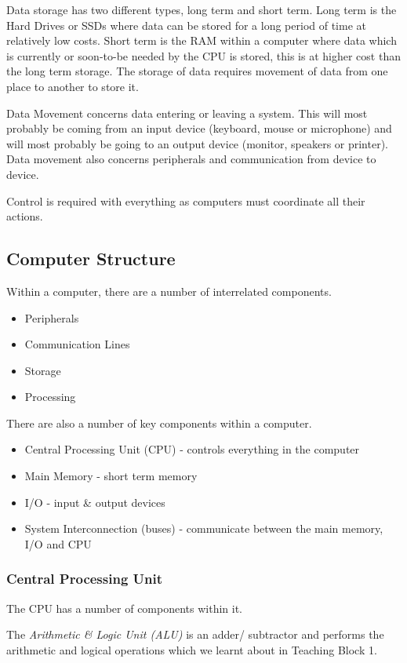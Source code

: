 Data storage has two different types, long term and short term. Long term is the Hard Drives or SSDs where data can be stored for a long period of time at relatively low costs. Short term is the RAM within a computer where data which is currently or soon-to-be needed by the CPU is stored, this is at higher cost than the long term storage. The storage of data requires movement of data from one place to another to store it.

Data Movement concerns data entering or leaving a system. This will most probably be coming from an input device (keyboard, mouse or microphone) and will most probably be going to an output device (monitor, speakers or printer). Data movement also concerns peripherals and communication from device to device.

Control is required with everything as computers must coordinate all their actions.

\subsection*{Computer Structure}
Within a computer, there are a number of interrelated components.
\begin{itemize}
    \item Peripherals
    \item Communication Lines
    \item Storage
    \item Processing
\end{itemize}
There are also a number of key components within a computer.
\begin{itemize}
    \item Central Processing Unit (CPU) - controls everything in the computer
    \item Main Memory - short term memory
    \item I/O - input \& output devices
    \item System Interconnection (buses) - communicate between the main memory, I/O and CPU
\end{itemize}

\subsubsection*{Central Processing Unit}
The CPU has a number of components within it.

The \textit{Arithmetic \& Logic Unit (ALU)} is an adder/ subtractor and performs the arithmetic and logical operations which we learnt about in Teaching Block 1.

